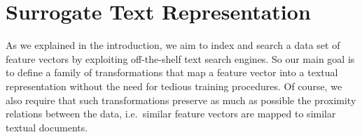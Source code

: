 

\section{Surrogate Text Representation} %
\label{sec:str:surrogate}
As we explained in the introduction, we aim to index and search a data set of feature vectors by exploiting off-the-shelf text search engines.
So our main goal is to define a family of transformations that map a feature vector into a textual representation without the need for tedious training procedures.
Of course, we also require that such transformations preserve as much as possible the proximity relations between the data, i.e.\ similar feature vectors are mapped to similar textual documents.

